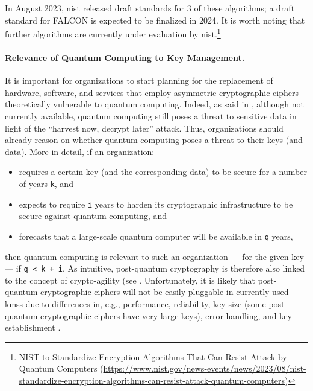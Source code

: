 In August 2023, \gls{nist} released draft standards for 3 of these algorithms; a draft standard for FALCON is expected to be finalized in 2024. It is worth noting that further algorithms are currently under evaluation by \gls{nist}.\footnote{NIST to Standardize Encryption Algorithms That Can Resist Attack by Quantum Computers (\url{https://www.nist.gov/news-events/news/2023/08/nist-standardize-encryption-algorithms-can-resist-attack-quantum-computers})} 


\paragraph*{Relevance of Quantum Computing to Key Management.}

It is important for organizations to start planning for the replacement of hardware, software, and services that employ asymmetric cryptographic ciphers theoretically vulnerable to quantum computing. Indeed, as said in , although not currently available, quantum computing still poses a threat to sensitive data in light of the ``harvest now, decrypt later'' attack. Thus, organizations should already reason on whether quantum computing poses a threat to their keys (and data). More in detail, if an organization:
\begin{itemize}
	\item requires a certain key (and the corresponding data) to be secure for a number of years {\tt k}, and
	\item expects to require {\tt i} years to harden its cryptographic infrastructure to be secure against quantum computing, and
	\item forecasts that a large-scale quantum computer will be available in {\tt q} years,
\end{itemize} 

then quantum computing is relevant to such an organization --- for the given key --- if {\tt q < k + i}. As intuitive, post-quantum cryptography is therefore also linked to the concept of crypto-agility (see . Unfortunately, it is likely that post-quantum cryptographic ciphers will not be easily pluggable in currently used \glspl{kms} due to differences in, e.g., performance, reliability, key size (some post-quantum cryptographic ciphers have very large keys), error handling, and key establishment \cite{newhouse_migration_2023}. 

